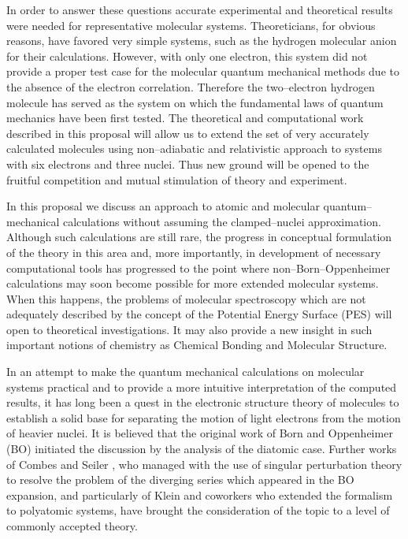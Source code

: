 In order to answer these questions accurate experimental
and theoretical results were needed for representative
molecular systems. Theoreticians, for obvious reasons, have
favored very simple systems, such as the hydrogen molecular
anion for their calculations. However, with only one electron,
this system did not provide a proper test case for the molecular
quantum mechanical methods due to the absence of the
electron correlation. Therefore the two--electron hydrogen
molecule has served as the system on which the fundamental
laws of quantum mechanics have been first tested.
The theoretical and computational work described  in
this proposal will allow us to extend the set of very
accurately calculated molecules using non--adiabatic
and relativistic approach to systems with six electrons
and three nuclei. Thus new ground will be opened to
the fruitful competition and mutual stimulation of
theory and experiment.



In this proposal we discuss an approach to atomic and 
molecular quantum--mechanical calculations without assuming 
the clamped--nuclei approximation. Although such calculations
are still rare, the progress
in conceptual formulation of the theory in this area and, more
importantly, in development of necessary computational tools
has progressed to the point where non--Born--Oppenheimer
calculations may soon become possible for more extended molecular
systems. When this happens, 
the problems of molecular spectroscopy
which are not adequately described 
by the concept of the Potential Energy Surface (PES)
will open to theoretical investigations.
It may also provide a new insight in such important notions of
chemistry as Chemical Bonding and Molecular Structure.

In an attempt to make the quantum mechanical calculations on 
molecular systems practical and to provide a more intuitive
interpretation of the computed results, it has long been a quest
in the electronic structure theory of molecules 
to establish a solid base for separating
the motion of light electrons from the motion of heavier nuclei.
It is believed that the original work of Born and Oppenheimer (BO)
\cite{BO1927} initiated the discussion by the analysis
of the diatomic case. Further works of Combes and Seiler
\cite{CS1980}, who managed with the use of singular perturbation
theory to resolve the problem of the diverging series which appeared
in the BO expansion, and particularly of Klein and coworkers
\cite{KM1992} who extended the formalism to polyatomic systems,
have brought the consideration of the topic to a level of commonly
accepted theory.


